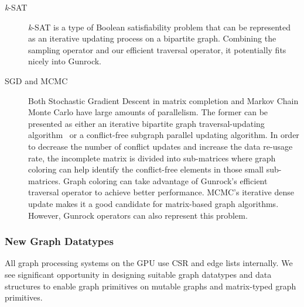 \documentclass[format=acmsmall,review=false,screen=true]{acmart}
\begin{document}
\begin{description}
\item[\emph{k}-SAT] \emph{k}-SAT is a type of Boolean satisfiability
  problem that can be represented as an iterative updating process on
  a bipartite graph. Combining the sampling operator and our efficient
  traversal operator, it potentially fits nicely into Gunrock.

\item[SGD and MCMC] Both Stochastic Gradient Descent in matrix
  completion and Markov Chain Monte Carlo have large amounts of
  parallelism. The former can be presented as either an iterative
  bipartite graph traversal-updating algorithm~\cite{Kaleem:2015:SGD}
  or a conflict-free subgraph parallel updating algorithm. In order to
  decrease the number of conflict updates and increase the data
  re-usage rate, the incomplete matrix is divided into sub-matrices
  where graph coloring can help identify the conflict-free elements in
  those small sub-matrices. Graph coloring can take advantage of
  Gunrock's efficient traversal operator to achieve better
  performance. MCMC's iterative dense update makes it a good candidate
  for matrix-based graph algorithms. However, Gunrock operators can
  also represent this problem.
\end{description}

\subsubsection{New Graph Datatypes}
All graph processing systems on the GPU use CSR and edge lists
internally. We see significant opportunity in designing suitable graph
datatypes and data structures to enable graph primitives on mutable
graphs and matrix-typed graph primitives.
\end{document}
